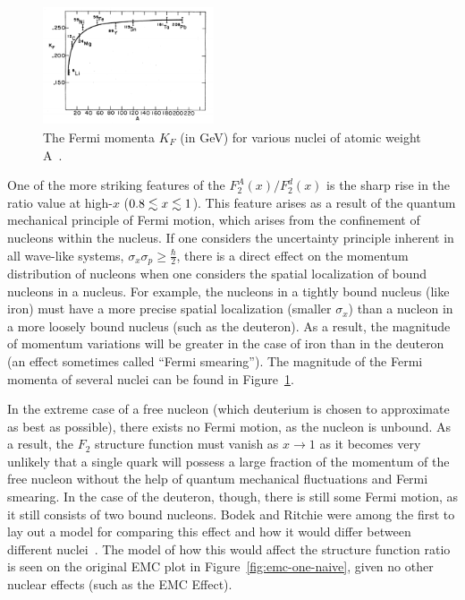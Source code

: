 \begin{figure}
	\centering
	\includegraphics[width=0.45\textwidth]{figures/background/fermi-momentum.png}
	\caption{The Fermi momenta $K_F$ (in GeV) for various nuclei of atomic weight A~\cite{PhysRevD.23.1070}.}
	\vspace{-20pt}
	\label{fig:fermi-momentum}
\end{figure}
One of the more striking features of the $F_2^A(x)/F_2^d(x)$ is the sharp rise in the ratio value at high-$x$ ($0.8\nobreak\lesssim\nobreak x\nobreak\lesssim\nobreak1$). This feature arises as a result of the quantum mechanical principle of Fermi motion, which arises from the confinement of nucleons within the nucleus. If one considers the uncertainty principle inherent in all wave-like systems, $\sigma_x \sigma_p \geq \frac{\hbar}{2}$, there is a direct effect on the momentum distribution of nucleons when one considers the spatial localization of bound nucleons in a nucleus. For example, the nucleons in a tightly bound nucleus (like iron) must have a more precise spatial localization (smaller $\sigma_x$) than a nucleon in a more loosely bound nucleus (such as the deuteron). As a result, the magnitude of momentum variations will be greater in the case of iron than in the deuteron (an effect sometimes called ``Fermi smearing''). The magnitude of the Fermi momenta of several nuclei can be found in Figure~\ref{fig:fermi-momentum}.

In the extreme case of a free nucleon (which deuterium is chosen to approximate as best as possible), there exists no Fermi motion, as the nucleon is unbound. As a result, the $F_2$ structure function must vanish as $x\rightarrow1$ as it becomes very unlikely that a single quark will possess a large fraction of the momentum of the free nucleon without the help of quantum mechanical fluctuations and Fermi smearing. In the case of the deuteron, though, there is still some Fermi motion, as it still consists of two bound nucleons. Bodek and Ritchie were among the first to lay out a model for comparing this effect and how it would differ between different nuclei~\cite{PhysRevD.23.1070}.  The model of how this would affect the structure function ratio is seen on the original EMC plot in Figure~\ref{fig:emc-one-naive}, given no other nuclear effects (such as the EMC Effect).


